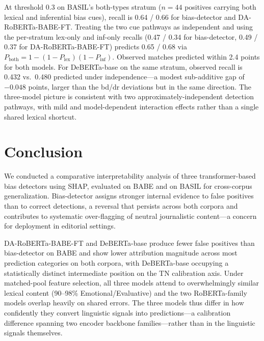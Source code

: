 \documentclass[11pt]{article}
\begin{document}
At threshold 0.3 on BASIL's both-types stratum ($n{=}44$ positives 
carrying both lexical and inferential bias cues), recall is 0.64 / 
0.66 for bias-detector and DA-RoBERTa-BABE-FT. Treating the two cue 
pathways as independent and using the per-stratum lex-only and 
inf-only recalls (0.47 / 0.34 for bias-detector, 0.49 / 0.37 for 
DA-RoBERTa-BABE-FT) predicts 0.65 / 0.68 via 
$P_\text{both} = 1 - (1 - P_\text{lex})(1 - P_\text{inf})$. Observed 
matches predicted within 2.4 points for both models. For 
DeBERTa-base on the same stratum, observed recall is 0.432 vs.\ 
0.480 predicted under independence---a modest sub-additive gap of 
$-0.048$ points, larger than the bd/dr deviations but in the same 
direction. The three-model picture is consistent with two 
approximately-independent detection pathways, with mild and 
model-dependent interaction effects rather than a single shared 
lexical shortcut.


\section{Conclusion}
We conducted a comparative interpretability analysis of three 
transformer-based bias detectors using SHAP, evaluated on BABE and 
on BASIL for cross-corpus generalization. Bias-detector assigns 
stronger internal evidence to false positives than to correct 
detections, a reversal that persists across both corpora and 
contributes to systematic over-flagging of neutral journalistic 
content---a concern for deployment in editorial settings.

DA-RoBERTa-BABE-FT and DeBERTa-base produce fewer false positives 
than bias-detector on BABE and show lower attribution magnitude 
across most prediction categories on both corpora, with DeBERTa-base 
occupying a statistically distinct intermediate position on the TN 
calibration axis. Under matched-pool feature selection, all three 
models attend to overwhelmingly similar lexical content (90--98\% 
Emotional/Evaluative) and the two RoBERTa-family models overlap 
heavily on shared errors. The three models thus differ in how 
confidently they convert linguistic signals into predictions---a 
calibration difference spanning two encoder backbone 
families---rather than in the linguistic signals themselves.
\end{document}
